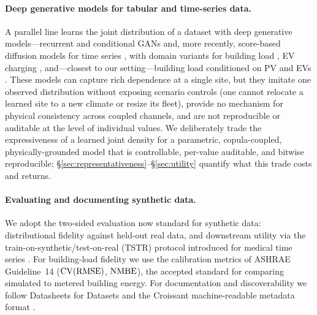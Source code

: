 \paragraph{Deep generative models for tabular and time-series data.}
A parallel line learns the joint distribution of a dataset with deep
generative models---recurrent and conditional GANs
\citep{esteban2017rgan,yoon2019timegan} and, more recently, score-based
diffusion models for time series \citep{tashiro2021csdi}, with domain
variants for building load \citep{wang2020generating}, EV charging
\citep{li2024diffcharge}, and---closest to our setting---building load
conditioned on PV and EVs \citep{li2025cgan}. These models
can capture rich dependence at a single site, but they imitate one observed
distribution without exposing scenario controls (one cannot relocate a
learned site to a new climate or resize its fleet), provide no mechanism for
physical consistency across coupled channels, and are not reproducible or
auditable at the level of individual values. We deliberately trade the
expressiveness of a learned joint density for a parametric, copula-coupled,
physically-grounded model that is controllable, per-value auditable, and
bitwise reproducible; \S\ref{sec:representativeness}--\S\ref{sec:utility}
quantify what this trade costs and returns.

\paragraph{Evaluating and documenting synthetic data.}
We adopt the two-sided evaluation now standard for synthetic data:
distributional fidelity against held-out real data, and downstream utility
via the train-on-synthetic/test-on-real (TSTR) protocol introduced for
medical time series \citep{esteban2017rgan}. For building-load fidelity we
use the calibration metrics of ASHRAE Guideline~14 \citep{ashrae2014g14}
($\mathrm{CV(RMSE)}{}$, $\mathrm{NMBE}{}$), the accepted standard for comparing simulated to
metered building energy. For documentation and discoverability we follow
Datasheets for Datasets \citep{gebru2021datasheets} and the Croissant
machine-readable metadata format \citep{akhtar2024croissant}.

